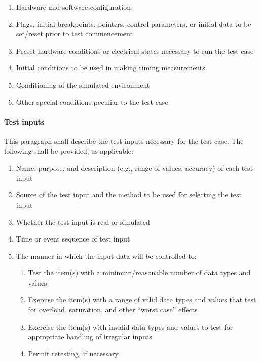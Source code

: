 \documentclass{fidata-report-template}
\begin{document}
\begin{enumerate}
\itemsep1pt\parskip0pt
\item
  Hardware and software configuration
\item
  Flags, initial breakpoints, pointers, control parameters, or initial
  data to be set/reset prior to test commencement
\item
  Preset hardware conditions or electrical states necessary to run the
  test case
\item
  Initial conditions to be used in making timing measurements
\item
  Conditioning of the simulated environment
\item
  Other special conditions peculiar to the test case
\end{enumerate}

\paragraph{Test inputs}

This paragraph shall describe the test inputs necessary for the test
case. The following shall be provided, as applicable:

\begin{enumerate}
\itemsep1pt\parskip0pt
\item
  Name, purpose, and description (e.g., range of values, accuracy) of
  each test input
\item
  Source of the test input and the method to be used for selecting the
  test input
\item
  Whether the test input is real or simulated
\item
  Time or event sequence of test input
\item
  The manner in which the input data will be controlled to:

  \begin{enumerate}
  \itemsep1pt\parskip0pt
  \item
    Test the item(s) with a minimum/reasonable number of data types and
    values
  \item
    Exercise the item(s) with a range of valid data types and values
    that test for overload, saturation, and other ``worst case'' effects
  \item
    Exercise the item(s) with invalid data types and values to test for
    appropriate handling of irregular inputs
  \item
    Permit retesting, if necessary
  \end{enumerate}
\end{enumerate}
\end{document}

